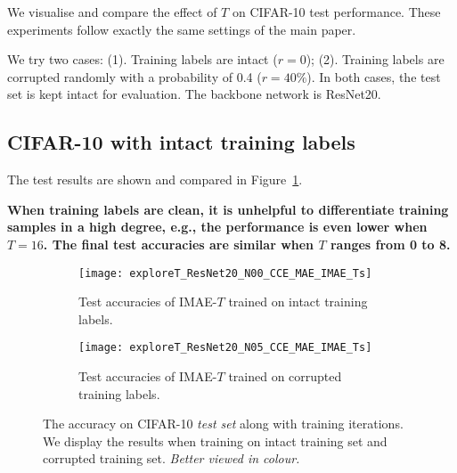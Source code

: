 \documentclass{article}
\begin{document}
We visualise and compare the effect of $T$ on CIFAR-10 test performance.
These experiments follow exactly the same settings of the main paper. 

We try two cases: (1). Training labels are intact ($r=0$); (2). Training labels are corrupted randomly with a probability of 0.4 ($r=40\%$). In both cases, the test set is kept intact for evaluation. The backbone network is ResNet20.

\subsection{CIFAR-10 with intact training labels}

The test results are shown and compared in Figure~\ref{fig:exploreT_ResNet20_N00_CCE_MAE_IMAE_Ts}.

{\textbf{When training labels are clean, it is unhelpful to differentiate training samples in a high degree, e.g., the performance is even lower when $T=16$. 
The final test accuracies are similar when $T$ ranges from 0 to 8.}}




\begin{figure*}[t!]
	\centering
\begin{subfigure}[t!]{0.48\linewidth}
		\centering
		\captionsetup{width=1\linewidth}
		\texttt{[image: exploreT\_ResNet20\_N00\_CCE\_MAE\_IMAE\_Ts]}
		\caption{Test accuracies of  IMAE-$T$ trained on intact training labels.}
		\label{fig:exploreT_ResNet20_N00_CCE_MAE_IMAE_Ts}
	\end{subfigure}
	\begin{subfigure}[t!]{0.480\linewidth}
		\centering
		\captionsetup{width=1\linewidth}
		\texttt{[image: exploreT\_ResNet20\_N05\_CCE\_MAE\_IMAE\_Ts]}
		\caption{Test accuracies of IMAE-$T$ trained on corrupted training labels.}
		\label{fig:exploreT_ResNet20_N05_CCE_MAE_IMAE_Ts}
	\end{subfigure}
\caption{The accuracy on CIFAR-10 \textit{test set} along with training iterations.
		We display the results when training on intact training set and corrupted training set. 
\textit{Better viewed in colour.} }
\end{figure*}
\end{document}
